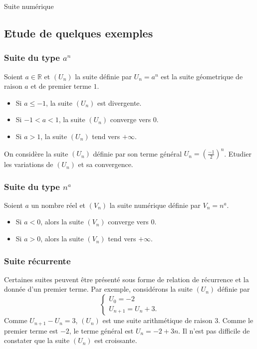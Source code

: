 \begin{chapter}{Suite num\'erique}
\subsection{Etude de quelques exemples}
%
\subsubsection{Suite du type $a^n$}
%
Soient $a \in \mathbb{R}$ et $(U_n)$ la suite d\'efinie par $U_n = a^n$ est la suite g\'eometrique de raison $a$ et de premier terme $1$.
\begin{itemize} 
\item Si $a \leq -1$, la suite $(U_n)$ est divergente.
\item Si $-1 < a < 1$, la suite $(U_n)$ converge vers $0$.
\item Si $a > 1$, la suite $(U_n)$ tend vers $+ \infty$.
\end{itemize}
\begin{exe}
\label{exe:-1/2 ^n}
On consid\`ere la suite $(U_n)$ d\'efinie par son terme g\'en\'eral $U_n = \left( \frac{-1}{2} \right)^n$.
Etudier les variations de $(U_n)$ et sa convergence.

\end{exe}
%
\subsubsection{Suite du type $n^a$}
%
Soient $a$ un nombre r\'eel et $(V_n)$ la suite num\'erique d\'efinie par $V_n = n^a$.
\begin{itemize} 
\item Si $a < 0$, alors la suite $(V_n)$ converge vers $0$.
\item Si $a > 0$, alors la suite $(V_n)$ tend vers $+\infty$.
\end{itemize}
%
\subsubsection{Suite r\'ecurrente}
%
Certaines suites peuvent \^etre pr\'esent\'e sous forme de relation de r\'ecurrence et la donn\'ee d'un premier terme.
Par exemple, consid\'erons la suite $(U_n)$ d\'efinie par 
\[
\left\lbrace
\begin{array}{l}
U_0 = -2 \\
U_{n+1} = U_n + 3 .
\end{array}
\right.
\]
Comme $U_{n+1} - U_n = 3$, $(U_n)$ est une suite arithm\'etique de raison $3$.
Comme le premier terme est $-2$, le terme g\'en\'eral est $U_n = -2 + 3n$.
Il n'est pas difficile de constater que la suite $(U_n)$ est croissante.


\end{chapter}
